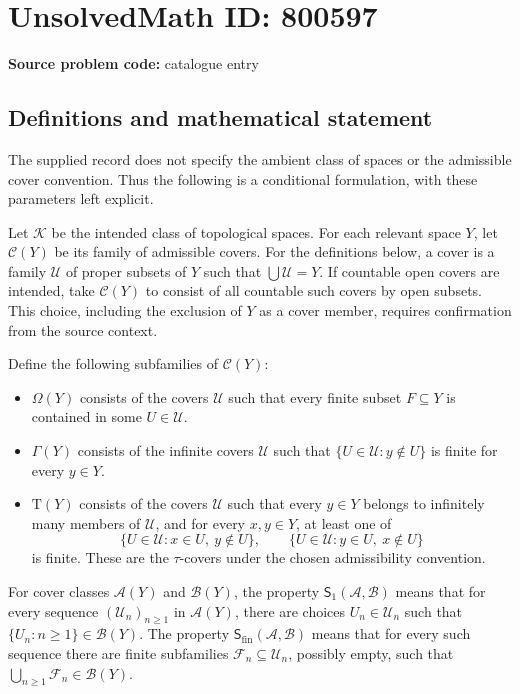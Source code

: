 \documentclass[11pt]{article}
\begin{document}
\section*{UnsolvedMath ID: 800597}
\textbf{Source problem code:} catalogue entry
\subsection{Definitions and mathematical statement}
The supplied record does not specify the ambient class of spaces or the admissible cover convention. Thus the following is a conditional formulation, with these parameters left explicit.

Let \(\mathcal K\) be the intended class of topological spaces. For each relevant space \(Y\), let \(\mathcal C(Y)\) be its family of admissible covers. For the definitions below, a cover is a family \(\mathcal U\) of proper subsets of \(Y\) such that \(\bigcup\mathcal U=Y\). If countable open covers are intended, take \(\mathcal C(Y)\) to consist of all countable such covers by open subsets. This choice, including the exclusion of \(Y\) as a cover member, requires confirmation from the source context.

Define the following subfamilies of \(\mathcal C(Y)\):
\begin{itemize}
\item \(\Omega(Y)\) consists of the covers \(\mathcal U\) such that every finite subset \(F\subseteq Y\) is contained in some \(U\in\mathcal U\).
\item \(\Gamma(Y)\) consists of the infinite covers \(\mathcal U\) such that \(\{U\in\mathcal U:y\notin U\}\) is finite for every \(y\in Y\).
\item \(\mathrm T(Y)\) consists of the covers \(\mathcal U\) such that every \(y\in Y\) belongs to infinitely many members of \(\mathcal U\), and for every \(x,y\in Y\), at least one of
\[
\{U\in\mathcal U:x\in U,\ y\notin U\},\qquad
\{U\in\mathcal U:y\in U,\ x\notin U\}
\]
is finite. These are the \(\tau\)-covers under the chosen admissibility convention.
\end{itemize}
For cover classes \(\mathcal A(Y)\) and \(\mathcal B(Y)\), the property \(\mathsf S_1(\mathcal A,\mathcal B)\) means that for every sequence \((\mathcal U_n)_{n\geq1}\) in \(\mathcal A(Y)\), there are choices \(U_n\in\mathcal U_n\) such that \(\{U_n:n\geq1\}\in\mathcal B(Y)\). The property \(\mathsf S_{\mathrm{fin}}(\mathcal A,\mathcal B)\) means that for every such sequence there are finite subfamilies \(\mathcal F_n\subseteq\mathcal U_n\), possibly empty, such that \(\bigcup_{n\geq1}\mathcal F_n\in\mathcal B(Y)\).
\end{document}
